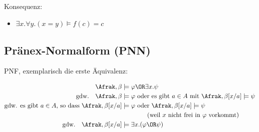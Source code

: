 Konsequenz:
\begin{itemize}
  \item $\exists x.\forall y.(x=y) \models f(c)=c$
\end{itemize}


\subsection{Pränex-Normalform (PNN)}

PNF, exemplarisch die erste Äquivalenz:

\begin{align}
  \Afrak, \beta &\models \varphi \OR \exists x.\psi \\
  \text{gdw.}\quad \Afrak, \beta &\models \varphi\ \text{oder es gibt}\ a\in A\ \text{mit}\ \Afrak, \beta[x/a] \models \psi \\
  \text{gdw. es gibt $a\in A$, so dass}\ \Afrak, \beta[x/a] &\models \varphi\ \text{oder}\ \Afrak, \beta[x/a] \models \psi\\
      & \qquad\qquad\text{(weil $x$ nicht frei in $\varphi$ vorkommt)} \\
  \text{gdw.}\quad \Afrak, \beta[x/a] &\models \exists x.(\varphi \OR \psi)
\end{align}

